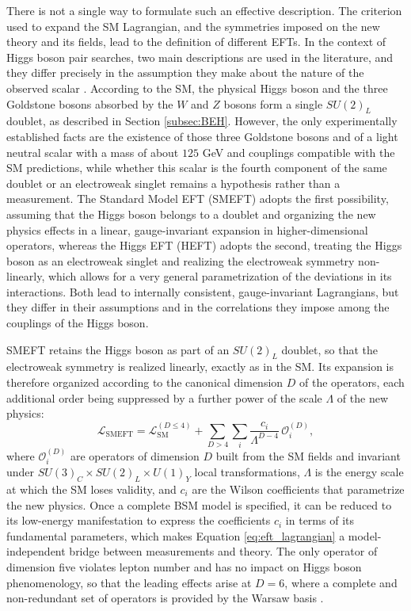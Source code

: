 There is not a single way to formulate such an effective description. The criterion used to expand the SM Lagrangian, and the symmetries imposed on the new theory and its fields, lead to the definition of different EFTs. In the context of Higgs boson pair searches, two main descriptions are used in the literature, and they differ precisely in the assumption they make about the nature of the observed scalar \cite{Alasfar:2023xpc}. According to the SM, the physical Higgs boson and the three Goldstone bosons absorbed by the $W$ and $Z$ bosons form a single $SU(2)_L$ doublet, as described in Section \ref{subsec:BEH}. However, the only experimentally established facts are the existence of those three Goldstone bosons and of a light neutral scalar with a mass of about $125$ GeV and couplings compatible with the SM predictions, while whether this scalar is the fourth component of the same doublet or an electroweak singlet remains a hypothesis rather than a measurement. The Standard Model EFT (SMEFT) adopts the first possibility, assuming that the Higgs boson belongs to a doublet and organizing the new physics effects in a linear, gauge-invariant expansion in higher-dimensional operators, whereas the Higgs EFT (HEFT) adopts the second, treating the Higgs boson as an electroweak singlet and realizing the electroweak symmetry non-linearly, which allows for a very general parametrization of the deviations in its interactions. Both lead to internally consistent, gauge-invariant Lagrangians, but they differ in their assumptions and in the correlations they impose among the couplings of the Higgs boson.\medskip

SMEFT retains the Higgs boson as part of an $SU(2)_L$ doublet, so that the electroweak symmetry is realized linearly, exactly as in the SM. Its expansion is therefore organized according to the canonical dimension $D$ of the operators, each additional order being suppressed by a further power of the scale $\Lambda$ of the new physics:
\begin{equation}
    \mathcal{L}_{\text{SMEFT}}
    = \mathcal{L}_{\text{SM}}^{(D\leq4)}
    + \sum_{D>4}\sum_i \frac{c_i}{\Lambda^{D-4}}\, \mathcal{O}_i^{(D)},
    \label{eq:eft_lagrangian}
\end{equation}
where $\mathcal{O}_i^{(D)}$ are operators of dimension $D$ built from the SM fields and invariant under $SU(3)_C\times SU(2)_L\times U(1)_Y$ local transformations, $\Lambda$ is the energy scale at which the SM loses validity, and $c_i$ are the Wilson coefficients that parametrize the new physics. Once a complete BSM model is specified, it can be reduced to its low-energy manifestation to express the coefficients $c_i$ in terms of its fundamental parameters, which makes Equation \ref{eq:eft_lagrangian} a model-independent bridge between measurements and theory. The only operator of dimension five violates lepton number and has no impact on Higgs boson phenomenology, so that the leading effects arise at $D=6$, where a complete and non-redundant set of operators is provided by the Warsaw basis \cite{Grzadkowski:2010es}.

